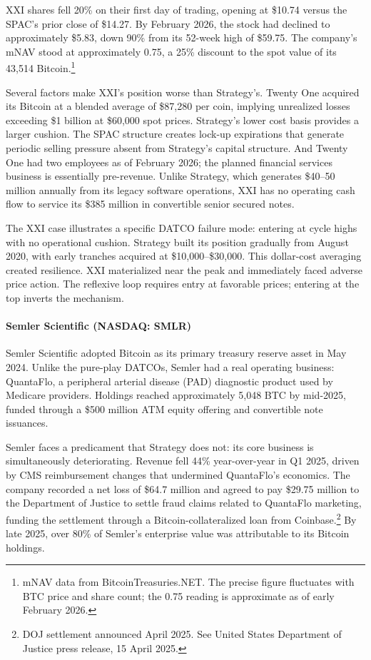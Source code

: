 XXI shares fell 20\% on their first day of trading, opening at \$10.74 versus the SPAC's prior close of \$14.27. By February 2026, the stock had declined to approximately \$5.83, down 90\% from its 52-week high of \$59.75. The company's mNAV stood at approximately 0.75, a 25\% discount to the spot value of its 43,514 Bitcoin.\footnote{mNAV data from BitcoinTreasuries.NET. The precise figure fluctuates with BTC price and share count; the 0.75 reading is approximate as of early February 2026.}

Several factors make XXI's position worse than Strategy's. Twenty One acquired its Bitcoin at a blended average of \$87,280 per coin, implying unrealized losses exceeding \$1 billion at \$60,000 spot prices. Strategy's lower cost basis provides a larger cushion. The SPAC structure creates lock-up expirations that generate periodic selling pressure absent from Strategy's capital structure. And Twenty One had two employees as of February 2026; the planned financial services business is essentially pre-revenue. Unlike Strategy, which generates \$40--50 million annually from its legacy software operations, XXI has no operating cash flow to service its \$385 million in convertible senior secured notes.

The XXI case illustrates a specific DATCO failure mode: entering at cycle highs with no operational cushion. Strategy built its position gradually from August 2020, with early tranches acquired at \$10,000--\$30,000. This dollar-cost averaging created resilience. XXI materialized near the peak and immediately faced adverse price action. The reflexive loop requires entry at favorable prices; entering at the top inverts the mechanism.

\paragraph{Semler Scientific (NASDAQ: SMLR)}

Semler Scientific adopted Bitcoin as its primary treasury reserve asset in May 2024. Unlike the pure-play DATCOs, Semler had a real operating business: QuantaFlo, a peripheral arterial disease (PAD) diagnostic product used by Medicare providers. Holdings reached approximately 5,048 BTC by mid-2025, funded through a \$500 million ATM equity offering and convertible note issuances.

Semler faces a predicament that Strategy does not: its core business is simultaneously deteriorating. Revenue fell 44\% year-over-year in Q1 2025, driven by CMS reimbursement changes that undermined QuantaFlo's economics. The company recorded a net loss of \$64.7 million and agreed to pay \$29.75 million to the Department of Justice to settle fraud claims related to QuantaFlo marketing, funding the settlement through a Bitcoin-collateralized loan from Coinbase.\footnote{DOJ settlement announced April 2025. See United States Department of Justice press release, 15 April 2025.} By late 2025, over 80\% of Semler's enterprise value was attributable to its Bitcoin holdings.

